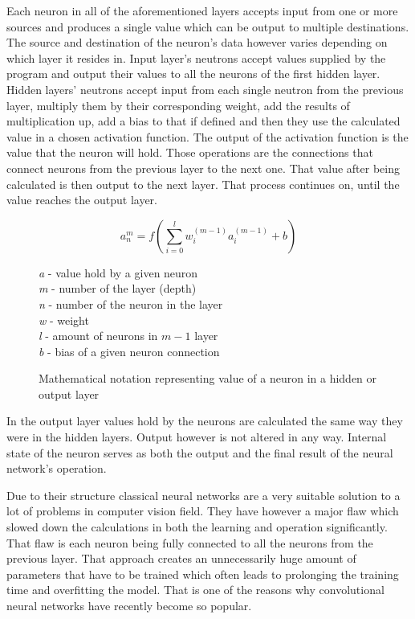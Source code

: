 \documentclass{ijisa}
\begin{document}
Each neuron in all of the aforementioned layers accepts input from one or more sources and produces a single value which can be output to multiple destinations. The source and destination of the neuron's data however varies depending on which layer it resides in. Input layer's neutrons accept values supplied by the program and output their values to all the neurons of the first hidden layer. Hidden layers' neutrons accept input from each single neutron from the previous layer, multiply them by their corresponding weight, add the results of multiplication up, add a bias to that if defined and then they use the calculated value in a chosen activation function. The output of the activation function is the value that the neuron will hold. Those operations are the connections that connect neurons from the previous layer to the next one. That value after being calculated is then output to the next layer. That process continues on, until the value reaches the output layer.

\begin{figure}[!h]
\centering
\[ a_n^m = f(\sum_{i=0}^{l} w_i^{(m-1)} a_i^{(m-1)} + b)\]

\textit{a} - value hold by a given neuron\\
\textit{m} - number of the layer (depth)\\
\textit{n} - number of the neuron in the layer\\
\textit{w} - weight\\
\textit{l} - amount of neurons in \(m-1\) layer\\
\textit{b} - bias of a given neuron connection

%
\caption{Mathematical notation representing value of a neuron in a hidden or output layer}
\end{figure}

In the output layer values hold by the neurons are calculated the same way they were in the hidden layers. Output however is not altered in any way. Internal state of the neuron serves as both the output and the final result of the neural network's operation. 

Due to their structure classical neural networks are a very suitable solution to a lot of problems in computer vision field. They have however a major flaw which slowed down the calculations in both the learning and operation significantly. That flaw is each neuron being fully connected to all the neurons from the previous layer. That approach creates an unnecessarily huge amount of parameters that have to be trained which often leads to prolonging the training time and overfitting the model. That is one of the reasons why convolutional neural networks have recently become so popular. 
\end{document}
